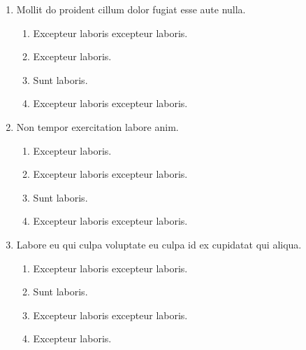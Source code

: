 \documentclass[a4paper,12pt]{article}
\begin{document}
\begin{enumerate}[label=\textbf{\arabic*.}]
\begin{multicols}{2}
\begin{enumerate}
		\item  Excepteur laboris excepteur laboris.
    
	\end{enumerate}

\end{multicols}
\item Mollit do proident cillum dolor fugiat esse aute nulla.
\begin{multicols}{2}
	\begin{enumerate}
		\item  Excepteur laboris excepteur laboris.
    
		\item  Excepteur laboris.
    
		\item  Sunt laboris.
    
		\item  Excepteur laboris excepteur laboris.
  
	\end{enumerate}

\end{multicols}
\item Non tempor exercitation labore anim.
\begin{multicols}{2}
	\begin{enumerate}
		\item  Excepteur laboris.
    
		\item  Excepteur laboris excepteur laboris.
  
		\item  Sunt laboris.
    
		\item  Excepteur laboris excepteur laboris.
    
	\end{enumerate}

\end{multicols}
\item Labore eu qui culpa voluptate eu culpa id ex cupidatat qui aliqua.
\begin{multicols}{2}
	\begin{enumerate}
		\item  Excepteur laboris excepteur laboris.
  
		\item  Sunt laboris.
    
		\item  Excepteur laboris excepteur laboris.
    
		\item  Excepteur laboris.
    

\end{enumerate}
\end{multicols}
\end{enumerate}
\end{document}
